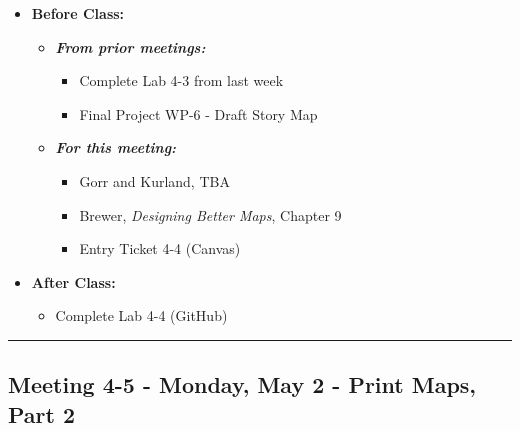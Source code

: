 \documentclass[
]{book}
\providecommand{\tightlist}{%
  \setlength{\itemsep}{0pt}\setlength{\parskip}{0pt}}
\begin{document}
\begin{itemize}
\tightlist
\item
  \textbf{Before Class:}

  \begin{itemize}
  \tightlist
  \item
    \textbf{\emph{From prior meetings:}}

    \begin{itemize}
    \tightlist
    \item
      Complete Lab 4-3 from last week
    \item
      Final Project WP-6 - Draft Story Map
    \end{itemize}
  \item
    \textbf{\emph{For this meeting:}}

    \begin{itemize}
    \tightlist
    \item
      Gorr and Kurland, TBA
    \item
      Brewer, \emph{Designing Better Maps}, Chapter 9
    \item
      Entry Ticket 4-4 (Canvas)
    \end{itemize}
  \end{itemize}
\item
  \textbf{After Class:}

  \begin{itemize}
  \tightlist
  \item
    Complete Lab 4-4 (GitHub)
  \end{itemize}
\end{itemize}

\begin{center}\rule{0.5\linewidth}{0.5pt}\end{center}

\hypertarget{meeting-4-5---monday-may-2---print-maps-part-2}{%
\subsection*{Meeting 4-5 - Monday, May 2 - Print Maps, Part 2}\label{meeting-4-5---monday-may-2---print-maps-part-2}}
\end{document}
